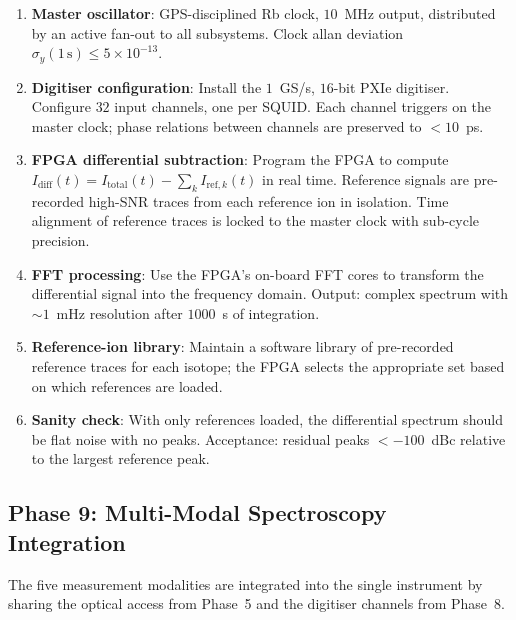\begin{enumerate}[leftmargin=1.5em]
    \item \textbf{Master oscillator}: GPS-disciplined Rb clock, $10$~MHz output, distributed by an active fan-out to all subsystems. Clock allan deviation $\sigma_y(1\,\text{s}) \le 5\times10^{-13}$.
    \item \textbf{Digitiser configuration}: Install the $1$~GS/s, $16$-bit PXIe digitiser. Configure $32$ input channels, one per SQUID. Each channel triggers on the master clock; phase relations between channels are preserved to $< 10$~ps.
    \item \textbf{FPGA differential subtraction}: Program the FPGA to compute $I_{\mathrm{diff}}(t) = I_{\mathrm{total}}(t) - \sum_{k} I_{\mathrm{ref},k}(t)$ in real time. Reference signals are pre-recorded high-SNR traces from each reference ion in isolation. Time alignment of reference traces is locked to the master clock with sub-cycle precision.
    \item \textbf{FFT processing}: Use the FPGA's on-board FFT cores to transform the differential signal into the frequency domain. Output: complex spectrum with $\sim 1$~mHz resolution after $1000$~s of integration.
    \item \textbf{Reference-ion library}: Maintain a software library of pre-recorded reference traces for each isotope; the FPGA selects the appropriate set based on which references are loaded.
    \item \textbf{Sanity check}: With only references loaded, the differential spectrum should be flat noise with no peaks. Acceptance: residual peaks $< -100$~dBc relative to the largest reference peak.
\end{enumerate}

\subsection{Phase 9: Multi-Modal Spectroscopy Integration}
\label{subsec:phase9_modalities}

The five measurement modalities are integrated into the single instrument by sharing the optical access from Phase~5 and the digitiser channels from Phase~8.

